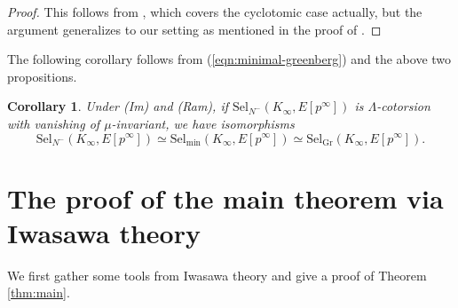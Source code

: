 \documentclass[11pt]{amsart}
\numberwithin{equation}{section}
\newtheorem{cor}[thm]{Corollary}
\theoremstyle{definition}
\begin{document}
\begin{proof}
This follows from \cite[Prop. 4.14]{greenberg-lnm}, which covers the cyclotomic case actually, but the argument generalizes to our setting as mentioned in the proof of \cite[Prop. 3.6]{pw-mu}.
\end{proof}
The following corollary follows from (\ref{eqn:minimal-greenberg}) and the above two propositions.
\begin{cor} \label{cor:selmer}
Under (Im) and (Ram), if $\mathrm{Sel}_{N^-}(K_\infty, E[p^\infty])$ is $\Lambda$-cotorsion with vanishing of $\mu$-invariant, we have isomorphisms
$$\mathrm{Sel}_{N^-}(K_\infty, E[p^\infty]) \simeq \mathrm{Sel}_{\mathrm{min}}(K_\infty, E[p^\infty]) \simeq \mathrm{Sel}_{\mathrm{Gr}}(K_\infty, E[p^\infty]).$$
\end{cor}

\section{The proof of the main theorem via Iwasawa theory} \label{sec:iwasawa-theory}
We first gather some tools from Iwasawa theory and give a proof of Theorem \ref{thm:main}.
\end{document}
